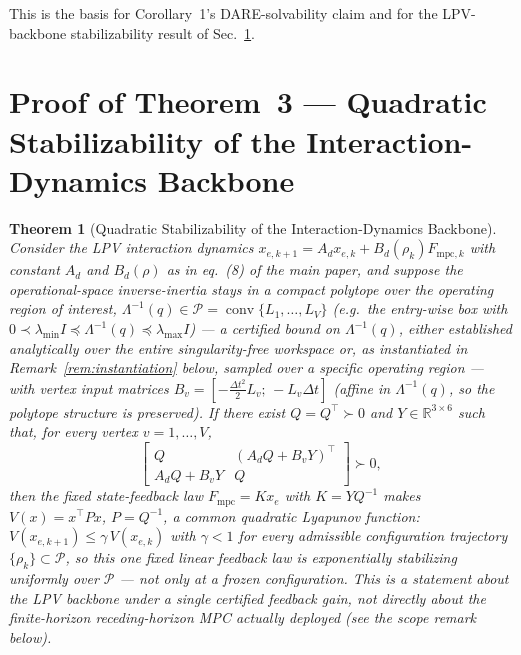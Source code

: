 \documentclass[journal]{IEEEtran}
\newtheorem{theorem}{Theorem}
\newcommand{\Laminv}{\Lambda^{-1}(q)}
\newcommand{\Fmpc}{F_{\text{mpc}}}
\newcommand{\Fmpck}[1]{F_{\text{mpc},#1}}
\begin{document}
This is the basis for Corollary~1's DARE-solvability claim and for the
LPV-backbone stabilizability result of Sec.~\ref{sec:stab}.

\section{Proof of Theorem~3 --- Quadratic Stabilizability of the Interaction-Dynamics Backbone}\label{sec:stab}

\begin{theorem}[Quadratic Stabilizability of the Interaction-Dynamics
Backbone]\label{thm:workspace}
Consider the LPV interaction dynamics
$x_{e,k+1}=A_dx_{e,k}+B_d(\rho_k)\Fmpck{k}$ with constant $A_d$ and
$B_d(\rho)$ as in eq.~(8) of the main paper, and suppose the
operational-space inverse-inertia stays in a compact polytope over the
operating region of interest,
$\Laminv\in\mathcal P=\operatorname{conv}\{L_1,\dots,L_V\}$ (e.g.\ the
entry-wise box with $0\prec\lambda_{\min}I\preceq\Laminv\preceq\lambda_{\max}I$)
--- a certified bound on $\Laminv$, either established analytically over
the entire singularity-free workspace or, as instantiated in
Remark~\ref{rem:instantiation} below, sampled over a specific operating
region --- with vertex input matrices
$B_v=[-\tfrac{\Delta t^2}2L_v;\,-L_v\Delta t]$ (affine in $\Laminv$, so
the polytope structure is preserved). If there exist $Q=Q^\top\succ0$ and
$Y\in\mathbb R^{3\times6}$ such that, for every vertex $v=1,\dots,V$,
\begin{equation}
\begin{bmatrix}Q & (A_dQ+B_vY)^\top\\A_dQ+B_vY & Q\end{bmatrix}\succ0,
\label{eq:lmi}
\end{equation}
then the \emph{fixed} state-feedback law $\Fmpc=Kx_e$ with $K=YQ^{-1}$
makes $V(x)=x^\top Px$, $P=Q^{-1}$, a \emph{common} quadratic Lyapunov
function: $V(x_{e,k+1})\le\gamma\,V(x_{e,k})$ with $\gamma<1$ for
\emph{every} admissible configuration trajectory
$\{\rho_k\}\subset\mathcal P$, so this one fixed linear feedback law is
exponentially stabilizing uniformly over $\mathcal P$ --- not only at a
frozen configuration. This is a statement about the LPV \emph{backbone}
under a single certified feedback gain, not directly about the
finite-horizon receding-horizon MPC actually deployed (see the scope
remark below).
\end{theorem}
\end{document}
